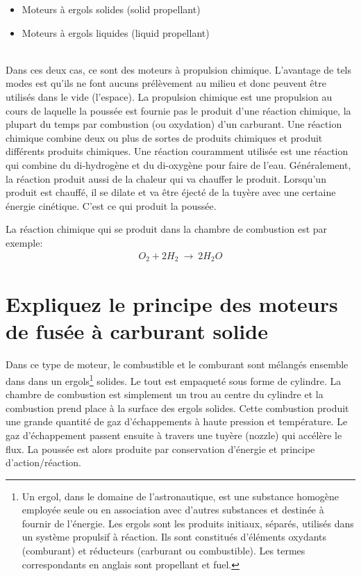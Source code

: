 \documentclass{report}
\begin{document}
\begin{itemize}
    \item Moteurs à ergols solides (solid propellant)
    \item Moteurs à ergols liquides (liquid propellant)
\end{itemize}
\\[0.5cm]
Dans ces deux cas, ce sont des moteurs à propulsion chimique. L'avantage de tels modes est qu'ils ne font aucuns prélèvement au milieu et donc peuvent être utilisés dans le vide (l'espace). La propulsion chimique est une propulsion au cours de laquelle la poussée est fournie pas le produit d'une réaction chimique, la plupart du temps par combustion (ou oxydation) d'un carburant. Une réaction chimique combine deux ou plus de sortes de produits chimiques et produit différents produits chimiques. Une réaction couramment utilisée est une réaction qui combine du di-hydrogène et du di-oxygène pour faire de l'eau. Généralement, la réaction produit aussi de la chaleur qui va chauffer le produit. Lorsqu'un produit est chauffé, il se dilate et va être éjecté de la tuyère avec une certaine énergie cinétique. C'est ce qui produit la poussée.

La réaction chimique qui se produit dans la chambre de combustion est par exemple:
\begin{eqnarray}
O_2+2H_2~\rightarrow~2H_2O
\end{eqnarray}

\section{Expliquez le principe des moteurs de fusée à carburant solide}

Dans ce type de moteur, le combustible et le comburant sont mélangés ensemble dans dans un ergols\footnote{Un ergol, dans le domaine de l'astronautique, est une substance homogène employée seule ou en association avec d'autres substances et destinée à fournir de l'énergie. Les ergols sont les produits initiaux, séparés, utilisés dans un système propulsif à réaction. Ils sont constitués d'éléments oxydants (comburant) et réducteurs (carburant ou combustible). Les termes correspondants en anglais sont propellant et fuel.} solides. Le tout est empaqueté sous forme de cylindre. La chambre de combustion est simplement un trou au centre du cylindre et la combustion prend place à la surface des ergols solides. Cette combustion produit une grande quantité de gaz d'échappements à haute pression et température. Le gaz d'échappement passent ensuite à travers une tuyère (nozzle) qui accélère le flux. La poussée est alors produite par conservation d'énergie et principe d'action/réaction. 
\end{document}
